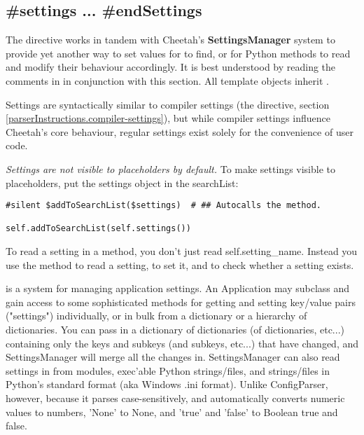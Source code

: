 \subsection{\#settings ... \#endSettings}
\label{inheritanceEtc.settings}

The  directive works in tandem with Cheetah's
{\bf SettingsManager} system to provide yet another way to set values for
 to find, or for Python methods to read and modify their
behaviour accordingly.  It is best understood by reading the comments in
 in conjunction with this section.  All 
template objects inherit .

Settings are syntactically similar to compiler settings (the
 directive, section
\ref{parserInstructions.compiler-settings}), but while compiler settings
influence Cheetah's core behaviour, regular settings exist solely for the
convenience of user code.

{\em Settings are not visible to placeholders by default.}  To make settings
visible to placeholders, put the settings object in the searchList:  

\begin{verbatim}
#silent $addToSearchList($settings)  # ## Autocalls the method.

self.addToSearchList(self.settings())
\end{verbatim}


To read a setting in a method, you don't just read self.setting\_name.  Instead
you use the  method to read a setting,
 to set it, and  to
check whether a setting exists.  

 is a system for managing application settings.  An
Application may subclass  and gain access
to some sophisticated methods for getting and setting key/value pairs
("settings") individually, or in bulk from a dictionary or a hierarchy of
dictionaries.  You can pass in a dictionary of dictionaries (of dictionaries,
etc...) containing only the keys and subkeys (and subkeys, etc...) that have
changed, and SettingsManager will merge all the changes in.  SettingsManager can
also read settings in from modules, exec'able Python strings/files, and
strings/files in Python's standard  format (aka Windows .ini
format).  Unlike ConfigParser, however, because it parses case-sensitively, and
automatically converts numeric values to numbers, 'None' to None, and 'true' and
'false' to Boolean true and false.

